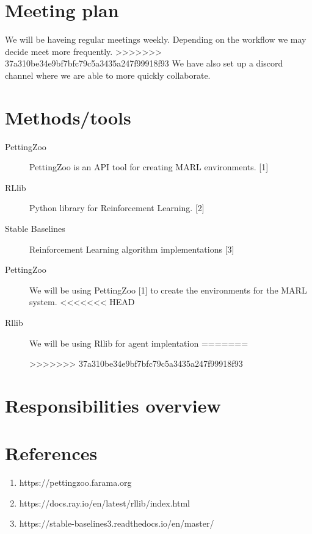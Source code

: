 \documentclass{article}
\begin{document}
\section{Meeting plan}
We will be haveing regular meetings weekly. Depending on the workflow we may decide meet more frequently.
>>>>>>> 37a310be34e9bf7bfc79c5a3435a247f99918f93
We have also set up a discord channel where we are able to more quickly collaborate.

\section{Methods/tools}
\begin{description}
  \item[PettingZoo] PettingZoo is an API tool for creating MARL environments. [1]
  \item[RLlib] Python library for Reinforcement Learning. [2]
  \item[Stable Baselines] Reinforcement Learning algorithm implementations [3]

  \item[PettingZoo] We will be using PettingZoo [1] to create the environments for the MARL system.
<<<<<<< HEAD
  \item[Rllib] We will be using Rllib for agent implentation
=======

>>>>>>> 37a310be34e9bf7bfc79c5a3435a247f99918f93
\end{description}


\section{Responsibilities overview}


\section*{References}
\begin{enumerate}
  \item https://pettingzoo.farama.org
  \item https://docs.ray.io/en/latest/rllib/index.html
  \item https://stable-baselines3.readthedocs.io/en/master/
\end{enumerate}
\end{document}

